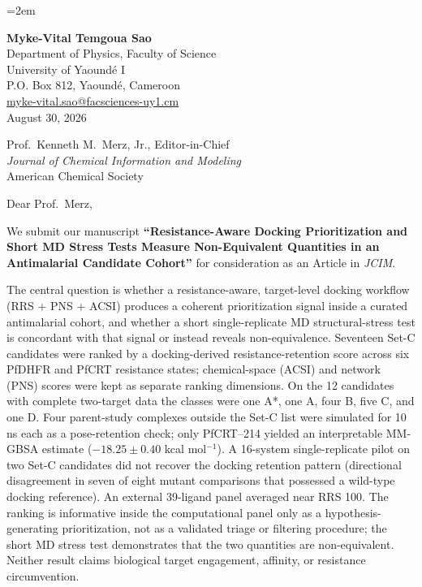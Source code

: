 \documentclass[11pt,letterpaper]{article}
\begin{document}
\emergencystretch=2em

\begin{flushleft}
\textbf{Myke-Vital Temgoua Sao} \\
Department of Physics, Faculty of Science \\
University of Yaound\'{e} I \\
P.O. Box 812, Yaound\'{e}, Cameroon \\
\href{mailto:myke-vital.sao@facsciences-uy1.cm}{myke-vital.sao@facsciences-uy1.cm} \\[1.5em]
August 30, 2026
\end{flushleft}

\begin{flushleft}
Prof.\ Kenneth M.\ Merz, Jr., Editor-in-Chief \\
\textit{Journal of Chemical Information and Modeling} \\
American Chemical Society
\end{flushleft}

\vspace{0.5em}

\noindent Dear Prof.\ Merz,

We submit our manuscript \textbf{``Resistance-Aware Docking Prioritization and Short MD Stress Tests Measure Non-Equivalent Quantities in an Antimalarial Candidate Cohort''} for consideration as an Article in \textit{JCIM}.

The central question is whether a resistance-aware, target-level docking workflow (RRS + PNS + ACSI) produces a coherent prioritization signal inside a curated antimalarial cohort, and whether a short single-replicate MD structural-stress test is concordant with that signal or instead reveals non-equivalence. Seventeen Set-C candidates were ranked by a docking-derived resistance-retention score across six PfDHFR and PfCRT resistance states; chemical-space (ACSI) and network (PNS) scores were kept as separate ranking dimensions. On the 12 candidates with complete two-target data the classes were one A*, one A, four B, five C, and one D. Four parent-study complexes outside the Set-C list were simulated for 10 ns each as a pose-retention check; only PfCRT--214 yielded an interpretable MM-GBSA estimate ($-18.25\pm0.40$ kcal mol$^{-1}$). A 16-system single-replicate pilot on two Set-C candidates did not recover the docking retention pattern (directional disagreement in seven of eight mutant comparisons that possessed a wild-type docking reference). An external 39-ligand panel averaged near RRS 100. The ranking is informative inside the computational panel only as a hypothesis-generating prioritization, not as a validated triage or filtering procedure; the short MD stress test demonstrates that the two quantities are non-equivalent. Neither result claims biological target engagement, affinity, or resistance circumvention.
\end{document}
